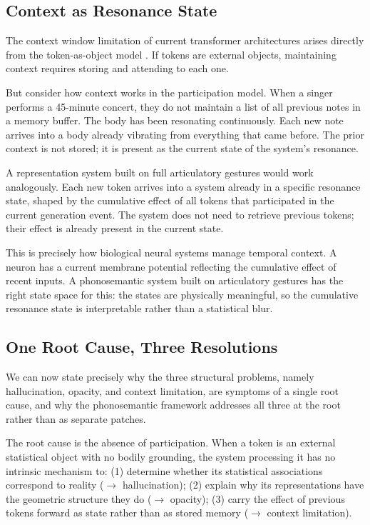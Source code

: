 \documentclass[12pt]{article}
\begin{document}
\subsection{Context as Resonance State}

The context window limitation of current transformer architectures arises directly from the token-as-object model \citep{vaswani2017}. If tokens are external objects, maintaining context requires storing and attending to each one.

But consider how context works in the participation model. When a singer performs a 45-minute concert, they do not maintain a list of all previous notes in a memory buffer. The body has been resonating continuously. Each new note arrives into a body already vibrating from everything that came before. The prior context is not stored; it is present as the current state of the system's resonance.

A representation system built on full articulatory gestures would work analogously. Each new token arrives into a system already in a specific resonance state, shaped by the cumulative effect of all tokens that participated in the current generation event. The system does not need to retrieve previous tokens; their effect is already present in the current state.

This is precisely how biological neural systems manage temporal context. A neuron has a current membrane potential reflecting the cumulative effect of recent inputs. A phonosemantic system built on articulatory gestures has the right state space for this: the states are physically meaningful, so the cumulative resonance state is interpretable rather than a statistical blur.

\subsection{One Root Cause, Three Resolutions}

We can now state precisely why the three structural problems, namely hallucination, opacity, and context limitation, are symptoms of a single root cause, and why the phonosemantic framework addresses all three at the root rather than as separate patches.

The root cause is the absence of participation. When a token is an external statistical object with no bodily grounding, the system processing it has no intrinsic mechanism to: (1) determine whether its statistical associations correspond to reality ($\to$ hallucination); (2) explain why its representations have the geometric structure they do ($\to$ opacity); (3) carry the effect of previous tokens forward as state rather than as stored memory ($\to$ context limitation).
\end{document}
